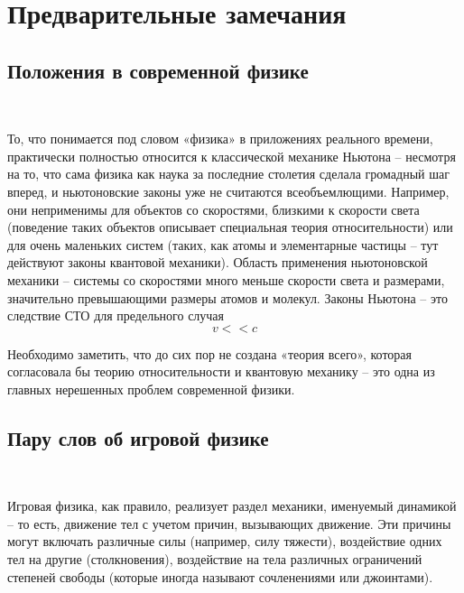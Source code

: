 \chapter{Предварительные замечания}
\section{Положения в современной физике}
\

То, что понимается под словом «физика» в приложениях
реального времени, практически полностью относится к
классической механике Ньютона – несмотря на то, что сама
физика как наука за последние столетия сделала громадный
шаг вперед, и ньютоновские законы уже не считаются
всеобъемлющими. Например, они неприменимы для объектов
со скоростями, близкими к скорости света (поведение таких
объектов описывает специальная теория относительности) или
для очень маленьких систем (таких, как атомы и элементарные
частицы – тут действуют законы квантовой механики). Область
применения ньютоновской механики – системы со скоростями
много меньше скорости света и размерами, значительно
превышающими размеры атомов и молекул. Законы Ньютона –
это следствие СТО для предельного случая 
\begin{equation}
v << c
\end{equation}

Необходимо заметить, что до сих пор не создана «теория всего»,
которая согласовала бы теорию относительности и квантовую
механику – это одна из главных нерешенных проблем
современной физики.
\\

\section{Пару слов об игровой физике}
\

Игровая физика, как правило, реализует раздел
механики, именуемый динамикой – то есть, движение тел с
учетом причин, вызывающих движение. Эти причины могут
включать различные силы (например, силу тяжести),
воздействие одних тел на другие (столкновения), воздействие
на тела различных ограничений степеней свободы (которые
иногда называют сочленениями или джоинтами).
